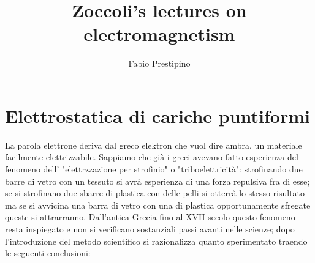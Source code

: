 \documentclass[10pt,a4paper]{article}
\author{Fabio Prestipino}
\title{Zoccoli's lectures on electromagnetism}
\begin{document}
	\maketitle
	\newpage
	\tableofcontents
	\newpage
\section{Elettrostatica di cariche puntiformi}
La parola elettrone deriva dal greco elektron che vuol dire ambra, un materiale facilmente elettrizzabile. Sappiamo che già i greci avevano fatto esperienza del fenomeno dell' "elettrzzazione per strofinio" o "triboelettricità": strofinando due barre di vetro con un tessuto si avrà esperienza di una forza repulsiva fra di esse; se si strofinano due sbarre di plastica con delle pelli si otterrà lo stesso risultato ma se si avvicina una barra di vetro con una di plastica opportunamente sfregate queste si attrarranno. Dall'antica Grecia fino al XVII secolo questo fenomeno resta inspiegato e non si verificano sostanziali passi avanti nelle scienze; dopo l'introduzione del metodo scientifico si razionalizza quanto sperimentato traendo le seguenti conclusioni:
\end{document}
